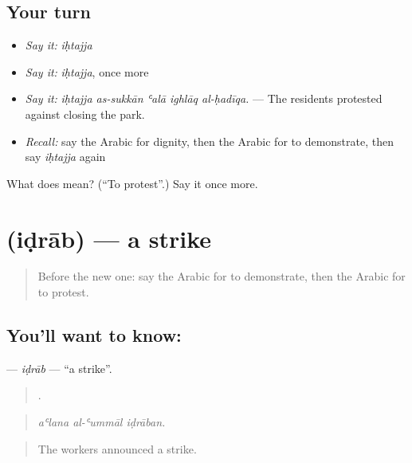 \subsection*{Your turn}
\begin{itemize}
\raggedright
  \item \emph{Say it:} \emph{iḥtajja}
  \item \emph{Say it:} \emph{iḥtajja}, once more
  \item \emph{Say it:} \emph{iḥtajja as-sukkān ʿalā ighlāq al-ḥadīqa.} — The residents protested against closing the park.
  \item \emph{Recall:} say the Arabic for dignity, then the Arabic for to demonstrate, then say \emph{iḥtajja} again
\end{itemize}

\begin{tcolorbox}[breakable,colback=teal!4,colframe=teal!35!black,title={Before you move on}]
What does  mean? (\textquotedblleft{}To protest\textquotedblright{}.) Say it once more.
\end{tcolorbox}
\section[\texorpdfstring{\ar{إضراب} (iḍrāb)}{إضراب (iḍrāb)}]{ (iḍrāb) — a strike}

\label{lesson:AR-C382-idrab}



\begin{quote}
Before the new one: say the Arabic for to demonstrate, then the Arabic for to protest.
\end{quote}

\subsection*{You'll want to know: }
\textbf{} — \emph{iḍrāb} — \textquotedblleft{}a strike\textquotedblright{}.

\begin{quote}
  .
\end{quote}

\begin{quote}
\emph{aʿlana al-ʿummāl iḍrāban.}
\end{quote}

\begin{quote}
The workers announced a strike.
\end{quote}

